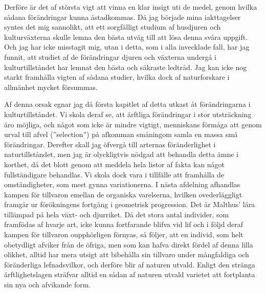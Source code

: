 Derföre är det af största vigt att vinna en klar insigt uti de medel, genom hvilka sådana förändringar kunna åstadkommas. Då jag började mina iakttagelser syntes det mig sannolikt, att ett sorgfälligt studium af husdjuren och kulturväxterna skulle lemna den bästa utväg till att lösa denna svåra uppgift. Och jag har icke misstagit mig, utan i detta, som i alla invecklade fall, har jag funnit, att studiet af de förändringar djuren och växterna undergå i kulturtillståndet har lemnat den bästa och säkraste ledtråd. Jag kan icke nog starkt framhålla vigten af sådana studier, hvilka dock af naturforskare i allmänhet mycket försummas.

Af denna orsak egnar jag då första kapitlet af detta utkast åt förändringarna i kulturtillståndet. Vi skola deraf se, att ärftliga förändringar i stor utsträckning äro möjliga, och något som icke är mindre vigtigt, menniskans förmåga att genom urval till afvel (”selection”) på afkomman småningom samla en massa små förändringar. Derefter skall jag öfvergå till arternas föränderlighet i naturtillståndet, men jag är olyckligtvis nödgad att behandla detta ämne i korthet, då det blott genom att meddela hela listor af fakta kan något fullständigare behandlas. Vi skola dock vara i tillfälle att framhålla de omständigheter, som mest gynna variationerna. I nästa afdelning afhandlas kampen för tillvaron emellan de organiska varelserna, hvilken ovederläggligt framgår ur förökningens fortgång i geometrisk progression. Det är Malthus’ lära tillämpad på hela växt- och djurriket. Då det stora antal individer, som framfödas af hvarje art, icke kunna fortfarande blifva vid lif och i följd deraf kampen för tillvaron oupphörligen förnyas, så följer, att en individ, som helt obetydligt afviker från de öfriga, men som kan hafva direkt fördel af denna lilla olikhet, alltid har mera utsigt att bibehålla sin tillvaro under mångfaldiga och föränderliga lefnadsvilkor, och derföre blir af naturen utvald. Enligt den stränga ärftlighetslagen sträfvar alltid en sådan af naturen utvald varietet att fortplanta sin nya och afvikande form.

